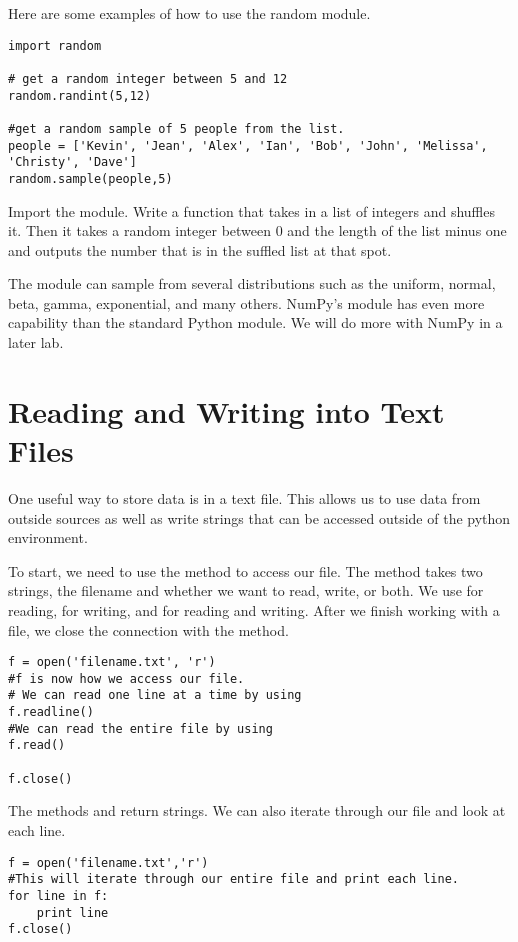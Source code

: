 Here are some examples of how to use the random module.
\begin{lstlisting}
import random

# get a random integer between 5 and 12
random.randint(5,12)

#get a random sample of 5 people from the list. 
people = ['Kevin', 'Jean', 'Alex', 'Ian', 'Bob', 'John', 'Melissa', 'Christy', 'Dave']
random.sample(people,5)
\end{lstlisting}

\begin{problem}
Import the  module.  Write a function that takes in a list of integers and shuffles it. Then it takes a random integer between 0 and the length of the list minus one and outputs the number that is in the suffled list at that spot.
\end{problem}

The  module can sample from several distributions such as the uniform, normal, beta, gamma, exponential, and many others.
NumPy's  module has even more capability than the standard Python  module.
We will do more with NumPy in a later lab.

\section*{Reading and Writing into Text Files}
One useful way to store data is in a text file.
This allows us to use data from outside sources as well as write strings that can be accessed outside of the python environment.

To start, we need to use the  method to access our file.
The method takes two strings, the filename and whether we want to read, write, or both.
We use  for reading,  for writing, and  for reading and writing.
After we finish working with a file, we close the connection with the  method.

\begin{lstlisting}
f = open('filename.txt', 'r')
#f is now how we access our file.
# We can read one line at a time by using
f.readline()
#We can read the entire file by using
f.read()

f.close()
\end{lstlisting}

The methods  and  return strings.
We can also iterate through our file and look at each line.

\begin{lstlisting}
f = open('filename.txt','r')
#This will iterate through our entire file and print each line.
for line in f:
	print line
f.close()
\end{lstlisting}

